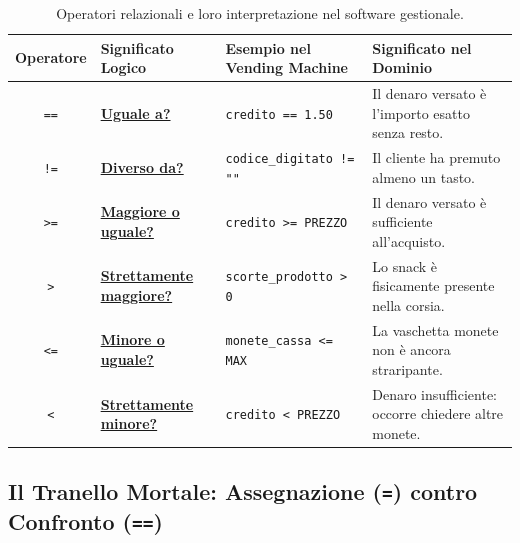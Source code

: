 \begin{table}[htbp]
\centering
\small
\begin{tabular}{|c|l|l|l|}
\hline
\rowcolor{PiazzaPrimary!15}
\textbf{Operatore} & \textbf{Significato Logico} & \textbf{Esempio nel Vending Machine} & \textbf{Significato nel Dominio} \\
\hline
\texttt{==} & \textbf{\underline{Uguale a?}} & \texttt{credito == 1.50} & Il denaro versato è l'importo esatto senza resto. \\
\hline
\texttt{!=} & \textbf{\underline{Diverso da?}} & \texttt{codice\_digitato != ""} & Il cliente ha premuto almeno un tasto. \\
\hline
\texttt{>=} & \textbf{\underline{Maggiore o uguale?}} & \texttt{credito >= PREZZO} & Il denaro versato è sufficiente all'acquisto. \\
\hline
\texttt{>} & \textbf{\underline{Strettamente maggiore?}} & \texttt{scorte\_prodotto > 0} & Lo snack è fisicamente presente nella corsia. \\
\hline
\texttt{<=} & \textbf{\underline{Minore o uguale?}} & \texttt{monete\_cassa <= MAX} & La vaschetta monete non è ancora straripante. \\
\hline
\texttt{<} & \textbf{\underline{Strettamente minore?}} & \texttt{credito < PREZZO} & Denaro insufficiente: occorre chiedere altre monete. \\
\hline
\end{tabular}
\caption{Operatori relazionali e loro interpretazione nel software gestionale.}
\label{tab:operatori-confronto}
\end{table}

\subsection{Il Tranello Mortale: Assegnazione (\texttt{=}) contro Confronto (\texttt{==})}

